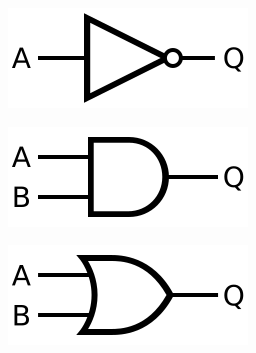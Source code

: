 \documentclass[11pt,a4paper]{article}
\begin{document}
\begin{figure}[H]
  \centering
    \begin{minipage}{0.7\textwidth}
    \centering
  \begin{subfigure}[t]{0.3\textwidth}
    \includegraphics[width=\linewidth]{images/NOT_ANSI_Labelled.svg.png}
  \end{subfigure}
  \hfill
  \begin{subfigure}[t]{0.3\textwidth}
    \includegraphics[width=\linewidth]{images/AND_ANSI_Labelled.svg.png}
  \end{subfigure}
  \hfill
  \begin{subfigure}[t]{0.3\textwidth}
    \includegraphics[width=\linewidth]{images/OR_ANSI_Labelled.svg.png}
  \end{subfigure}
  

  \vspace{1em}


\end{minipage}
\end{figure}
\end{document}
